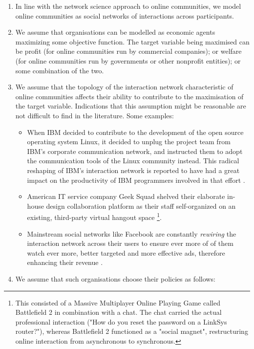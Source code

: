 \documentclass{nws}
\begin{document}
\begin{enumerate}
\item In line with the network science approach to online communities, we model online communities as social networks of interactions across participants. 
\item We assume that organisations can be modelled as economic agents maximizing some objective function. The target variable being maximised can be profit (for online communities run by commercial companies); or welfare (for online communities run by governments or other nonprofit entities); or some combination of the two. 
\item We assume that the topology of the interaction network characteristic of online communities affects their ability to contribute to the maximisation of the target variable. Indications that this assumption might be reasonable are not difficult to find in the literature. Some examples:
    \begin{itemize}
	\item When IBM decided to contribute to the development of the open source operating system Linux, it decided to unplug the project team from IBM's corporate communication network, and instructed them to adopt the communication tools of the Linux community instead. This radical reshaping of IBM's interaction network is reported to have had a great impact on the productivity of IBM programmers involved in that effort \cite{tapscott2008wikinomics}. 
	\item American IT service company Geek Squad shelved their elaborate in-house design collaboration platform as their staff self-organized on an existing, third-party virtual hangout space \cite{tapscott2008wikinomics} \footnote{This consisted of a Massive Multiplayer Online Playing Game called Battlefield 2 in combination with a chat. The chat carried the actual professional interaction ("How do you reset the password on a LinkSys router?"), whereas Battlefield 2 functioned as a "social magnet", restructuring online interaction from asynchronous to synchronous.}. 
	\item Mainstream social networks like Facebook are constantly \emph{rewiring} the interaction network across their users to ensure ever more of of them watch ever more, better targeted and more effective ads, therefore enhancing their revenue \cite{slegg2014facebook}.
	\end{itemize}
\item We assume that such organisations choose their policies as follows: 
    \begin{itemize} 

\end{itemize}
\end{enumerate}
\end{document}
